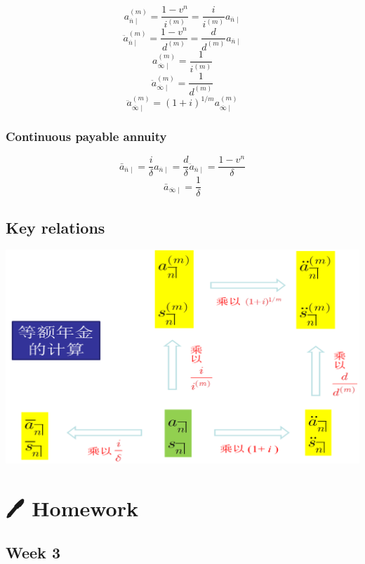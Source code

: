 \documentclass[
]{book}
\begin{document}
\[a^{(m)}_{\overline{n}\mid}=\frac{1-v^n}{i^{(m)}}=\frac{i}{i^{(m)}}a_{\overline{n}\mid}\]
\[\ddot{a}^{(m)}_{\overline{n}\mid}=\frac{1-v^n}{d^{(m)}}=\frac{d}{d^{(m)}}a_{\overline{n}\mid}\]
\[a^{(m)}_{\overline{\infty}\mid}=\frac{1}{i^{(m)}}\]
\[\ddot{a}^{(m)}_{\overline{\infty}\mid}=\frac{1}{d^{(m)}}\]
\[\ddot{a}^{(m)}_{\overline{\infty}\mid}=(1+i)^{1/m}a^{(m)}_{\overline{\infty}\mid}\]

\hypertarget{continuous-payable-annuity}{%
\subsection*{Continuous payable annuity}\label{continuous-payable-annuity}}

\[\bar{a}_{\overline{n}\mid}=\frac{i}{\delta}{a}_{\overline{n}\mid}=\frac{d}{\delta}\ddot{a}_{\overline{n}\mid}=\frac{1-v^n}{\delta}\]
\[\bar{a}_{\overline{\infty}\mid}=\frac{1}{\delta}\]

\hypertarget{key-relations}{%
\section{Key relations}\label{key-relations}}

\begin{center}\includegraphics[width=0.8\linewidth]{./plots/annuity-1} \end{center}

\hypertarget{homework}{%
\chapter*{🖊️ Homework}\label{homework}}

\hypertarget{week-3}{%
\section*{Week 3}\label{week-3}}
\end{document}
